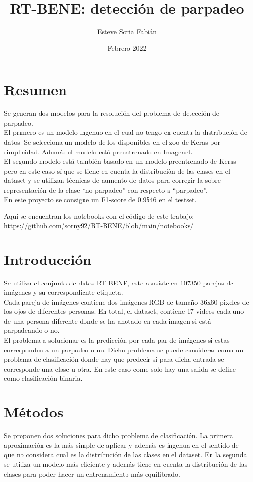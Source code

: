 \documentclass[12pt]{article}
\title{RT-BENE: detección de parpadeo}
\author{Esteve Soria Fabián}
\date{Febrero 2022}
\begin{document}
    \maketitle
    \newpage


    \section{Resumen}
    Se generan dos modelos para la resolución del problema de detección de parpadeo.\\
    El primero es un modelo ingenuo en el cual no tengo en cuenta la distribución de datos.
    Se selecciona un modelo de los disponibles en el zoo de Keras por simplicidad.
    Además el modelo está preentrenado en Imagenet.\\
    El segundo modelo está también basado en un modelo preentrenado de Keras pero en este caso sí que se tiene en
    cuenta la distribución de las clases en el dataset y se utilizan técnicas de aumento de datos para corregir la
    sobre-representación de la clase “no parpadeo” con respecto a “parpadeo”.\\
    En este proyecto se consigue un F1-score de 0.9546 en el testset.

    Aquí se encuentran los notebooks con el código de este trabajo:
    \url{https://github.com/sorny92/RT-BENE/blob/main/notebooks/}


    \section{Introducción}

    Se utiliza el conjunto de datos RT-BENE, este consiste en 107350 parejas de imágenes y su correspondiente
    etiqueta.\\
    Cada pareja de imágenes contiene dos imágenes RGB de tamaño 36x60 pixeles de los ojos de diferentes personas.
    En total, el dataset, contiene 17 videos cada uno de una persona diferente donde se ha anotado en cada imagen si
    está parpadeando o no.\\
    El problema a solucionar es la predicción por cada par de imágenes si estas corresponden a un parpadeo o no.
    Dicho problema se puede considerar como un problema de clasificación donde hay que predecir si para dicha entrada
    se corresponde una clase u otra.
    En este caso como solo hay una salida se define como clasificación binaria.


    \section{Métodos}
    Se proponen dos soluciones para dicho problema de clasificación.
    La primera aproximación es la más simple de aplicar y además es ingenua en el sentido de que no considera cual es
    la distribución de las clases en el dataset.
    En la segunda se utiliza un modelo más eficiente y además tiene en cuenta la distribución de las clases para
    poder hacer un entrenamiento más equilibrado.
\end{document}
